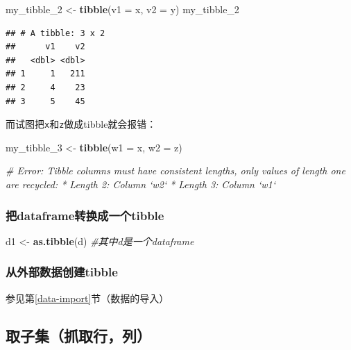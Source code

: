 \documentclass[]{book}
\newenvironment{Shaded}{\begin{snugshade}}{\end{snugshade}}
\newcommand{\CommentTok}[1]{\textcolor[rgb]{0.56,0.35,0.01}{\textit{#1}}}
\newcommand{\DataTypeTok}[1]{\textcolor[rgb]{0.13,0.29,0.53}{#1}}
\newcommand{\DecValTok}[1]{\textcolor[rgb]{0.00,0.00,0.81}{#1}}
\newcommand{\KeywordTok}[1]{\textcolor[rgb]{0.13,0.29,0.53}{\textbf{#1}}}
\newcommand{\NormalTok}[1]{#1}
\newcommand{\StringTok}[1]{\textcolor[rgb]{0.31,0.60,0.02}{#1}}
\begin{document}
\begin{Shaded}
\begin{Highlighting}[]
\NormalTok{my_tibble_}\DecValTok{2}\NormalTok{ <-}\StringTok{ }\KeywordTok{tibble}\NormalTok{(}\DataTypeTok{v1 =}\NormalTok{ x, }\DataTypeTok{v2 =}\NormalTok{ y)}
\NormalTok{my_tibble_}\DecValTok{2}
\end{Highlighting}
\end{Shaded}

\begin{verbatim}
## # A tibble: 3 x 2
##      v1    v2
##   <dbl> <dbl>
## 1     1   211
## 2     4    23
## 3     5    45
\end{verbatim}

而试图把\texttt{x}和\texttt{z}做成tibble就会报错：

\begin{Shaded}
\begin{Highlighting}[]
\NormalTok{my_tibble_}\DecValTok{3}\NormalTok{ <-}\StringTok{ }\KeywordTok{tibble}\NormalTok{(}\DataTypeTok{w1 =}\NormalTok{ x, }\DataTypeTok{w2 =}\NormalTok{ z)}

 \CommentTok{# Error: Tibble columns must have consistent lengths, only values of length one are recycled: * Length 2: Column `w2` * Length 3: Column `w1`}
\end{Highlighting}
\end{Shaded}

\hypertarget{dataframetibble}{%
\subsubsection{把dataframe转换成一个tibble}\label{dataframetibble}}

\begin{Shaded}
\begin{Highlighting}[]
\NormalTok{d1 <-}\StringTok{ }\KeywordTok{as.tibble}\NormalTok{(d) }\CommentTok{#其中d是一个dataframe}
\end{Highlighting}
\end{Shaded}

\hypertarget{tibble}{%
\subsubsection{从外部数据创建tibble}\label{tibble}}

参见第\ref{data-import}节（数据的导入）

\subsection{取子集（抓取行，列）}
\end{document}
